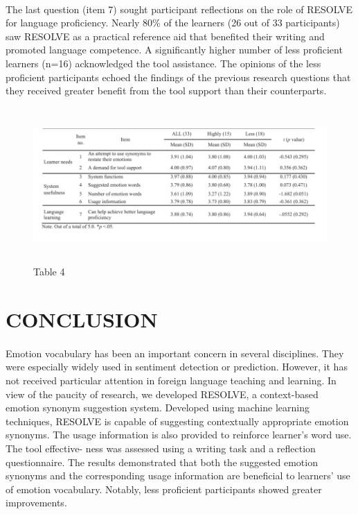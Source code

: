 \documentclass[a4paper,12pt,oneside]{article}
\begin{document}
\paragraph{}
The last question (item 7) sought participant reflections on the role of RESOLVE for language proficiency. Nearly 80\% of the learners (26 out of 33 participants) saw RESOLVE as a practical reference aid that benefited their writing and promoted language competence. A significantly higher number of less proficient learners (n=16) acknowledged the tool assistance. The opinions of the less proficient participants echoed the findings of the previous research questions that they received greater benefit from the tool support than their counterparts. 

\begin{figure}[H]
\includegraphics[height=5.9cm,width=15.4cm]{Table4.png}
\centering
\caption{Table 4}
\end{figure}

\newpage
\section{CONCLUSION}
\paragraph{}
Emotion vocabulary has been an important concern in several disciplines. They were especially widely used in sentiment detection or prediction. However, it has not received particular attention in foreign language teaching and learning. In view of the paucity of research, we developed RESOLVE, a context-based emotion synonym suggestion system. Developed using machine learning techniques, RESOLVE is capable of suggesting contextually appropriate emotion synonyms. The usage information is also provided to reinforce learner’s word use. The tool effective- ness was assessed using a writing task and a reflection questionnaire. The results demonstrated that both the suggested emotion synonyms and the corresponding usage information are beneficial to learners’ use of emotion vocabulary. Notably, less proficient participants showed greater improvements.
\end{document}
